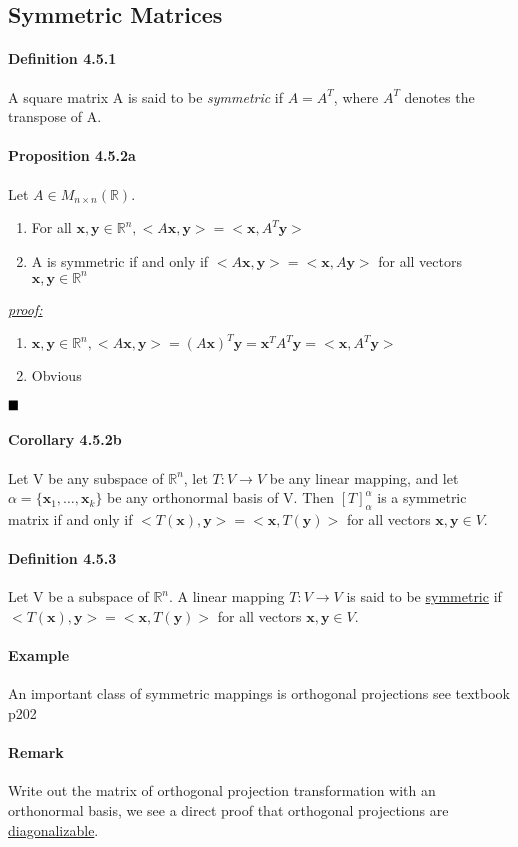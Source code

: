 \documentclass[11pt]{article}
\newcommand{\ti}[1]{\textit{#1}}
\newcommand{\tb}[1]{\textbf{#1}}
\newcommand{\under}[1]{\underline{#1}}
\newcommand{\proof}[0]{\textit{\underline{proof:} }}
\newcommand{\qed}[0]{$\hfill\blacksquare$}
\newcommand{\real}[0]{\mathbb{R}}
\newcommand{\vx}[0]{\tb{x}}
\newcommand{\vy}[0]{\tb{y}}
\begin{document}
{\subsection{Symmetric Matrices}
\paragraph{Definition 4.5.1} A square matrix A is said to be \ti{symmetric} if $A = A^T$, where $A^T$ denotes the transpose of A.
\paragraph{Proposition 4.5.2a} Let $A \in M_{n\times n}(\real)$.
\begin{enumerate}
	\item For all $\vx, \vy \in \real^n, <A\vx,\vy> = <\vx,A^T\vy>$
	\item A is symmetric if and only if $<A\vx,\vy> = <\vx,A\vy>$ for all vectors $\vx,\vy \in \real^n$
\end{enumerate}
\proof \\
\begin{enumerate}
	\item $\vx, \vy \in \real^n, <A\vx,\vy>=(A\vx)^T\vy=\vx^TA^T\vy = <\vx,A^T\vy>$
	\item Obvious
\end{enumerate}
\qed
\paragraph{Corollary 4.5.2b} Let V be any subspace of $\real^n$, let $T: V \rightarrow V$ be any linear mapping, and let $\alpha = \{\vx_1,\hdots,\vx_k\}$ be any orthonormal basis of V. Then $[T]_\alpha^\alpha$ is a symmetric matrix if and only if $<T(\vx),\vy> = <\vx,T(\vy)>$ for all vectors $\vx, \vy \in V$.
\paragraph{Definition 4.5.3} Let V be a subspace of $\real^n$. A linear mapping $T: V \rightarrow V$ is said to be \under{symmetric} if $<T(\vx),\vy> = <\vx,T(\vy)>$ for all vectors $\vx, \vy \in V$.
\paragraph{Example}
An important class of symmetric mappings is orthogonal projections
see textbook p202
\paragraph{Remark}
Write out the matrix of orthogonal projection transformation with an orthonormal basis, we see a direct proof that orthogonal projections are \under{diagonalizable}.
}
\end{document}
